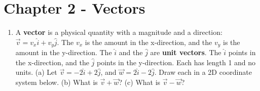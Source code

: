 \documentclass{article}
\begin{document}
\vspace{5cm}

\section{Chapter 2 - Vectors}

\begin{enumerate}
\item A \textbf{vector} is a physical quantity with a magnitude and a direction: $\vec{v} = v_x \hat{i} + v_y \hat{j}$.  The $v_x$ is the amount in the x-direction, and the $v_y$ is the amount in the y-direction.  The $\hat{i}$ and the $\hat{j}$ are \textbf{unit vectors}.  The $\hat{i}$ points in the x-direction, and the $\hat{j}$ points in the y-direction.  Each has length 1 and no units. (a) Let $\vec{v} = -2\hat{i} + 2\hat{j}$, and $\vec{w} = 2\hat{i} - 2\hat{j}$.  Draw each in a 2D coordinate system below. (b) What is $\vec{v} + \vec{w}$?  (c) What is $\vec{v} - \vec{w}$? \\ \vspace{3cm}
\end{enumerate}
\end{document}
